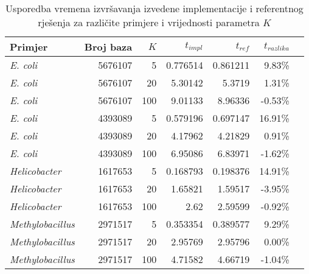 \documentclass[times, utf8, seminar, numeric]{fer}
\begin{document}
\begin{table}[h]
	\centering
	\caption{Usporedba vremena izvršavanja izvedene implementacije i referentnog rješenja za različite primjere i vrijednosti parametra $K$}
	\label{tbl:time-bacteria}
	
	\begin{tabular}{lrrrrrr}
		\hline
        Primjer & Broj baza & $K$ & $t_{impl}$ & $t_{ref}$ & $t_{razlika}$ \\ \hline
        \textit{E. coli} & 5676107 & 5 & 0.776514 & 0.861211 & 9.83\% \\
        \textit{E. coli} & 5676107 & 20 & 5.30142 & 5.3719 & 1.31\% \\
        \textit{E. coli} & 5676107 & 100 & 9.01133 & 8.96336 & -0.53\% \\ \hline
        \textit{E. coli} & 4393089 & 5 & 0.579196 & 0.697147 & 16.91\% \\
        \textit{E. coli} & 4393089 & 20 & 4.17962 & 4.21829 & 0.91\% \\
        \textit{E. coli} & 4393089 & 100 & 6.95086 & 6.83971 & -1.62\% \\ \hline
        \textit{Helicobacter} & 1617653 & 5 & 0.168793 & 0.198376 & 14.91\% \\
        \textit{Helicobacter} & 1617653 & 20 & 1.65821 & 1.59517 & -3.95\% \\
        \textit{Helicobacter} & 1617653 & 100 & 2.62 & 2.59599 & -0.92\% \\ \hline
        \textit{Methylobacillus} & 2971517 & 5 & 0.353354 & 0.389577 & 9.29\% \\
        \textit{Methylobacillus} & 2971517 & 20 & 2.95769 & 2.95796 & 0.00\% \\
        \textit{Methylobacillus} & 2971517 & 100 & 4.71582 & 4.66719 & -1.04\% \\
    \hline
	\end{tabular}
\end{table}
\end{document}

